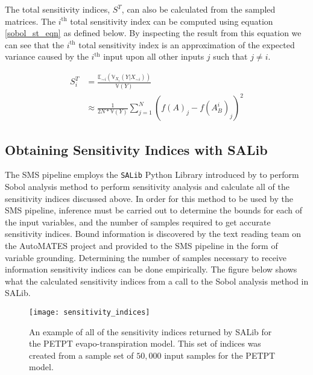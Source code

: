 The total sensitivity indices, $S^T$, can also be calculated from the sampled matrices. The $i^{\text{th}}$ total sensitivity index can be computed using equation \ref{sobol_st_eqn} as defined below. By inspecting the result from this equation we can see that the $i^{\text{th}}$ total sensitivity index is an approximation of the expected variance caused by the $i^{\text{th}}$ input upon all other inputs $j$ such that $j\neq i$.

\begin{equation} \label{sobol_st_eqn}
  \begin{split}
    S_i^T & = \frac{\mathbb{E}_{\sim i}\left(\mathbb{V}_{X_i}(Y | X_{\sim i})\right)}{\mathbb{V}(Y)} \\
    & \approx \frac{1}{2N * \mathbb{V}(Y)} \sum_{j=1}^{N} \left(f(A)_j - f(A_{B}^{i})_j\right)^2
  \end{split}
\end{equation}

\subsection{Obtaining Sensitivity Indices with SALib\label{sec:si_analysis}}
The SMS pipeline employs the \texttt{SALib} Python Library introduced by \citet{salib2017} to perform Sobol analysis method to perform sensitivity analysis and calculate all of the sensitivity indices discussed above.
In order for this method to be used by the SMS pipeline, inference must be carried out to determine the bounds for each of the input variables, and the number of samples required to get accurate sensitivity indices.
Bound information is discovered by the text reading team on the AutoMATES project and provided to the SMS pipeline in the form of variable grounding.
Determining the number of samples necessary to receive information sensitivity indices can be done empirically.
The figure below shows what the calculated sensitivity indices from a call to the Sobol analysis method in SALib.

\FloatBarrier
\begin{figure}[!htbp]
    \label{sens_idxs}
    \centering
    \texttt{[image: sensitivity\_indices]}%
    \caption[PETPT Sensitivity Indices]{An example of all of the sensitivity indices returned by SALib for the PETPT evapo-transpiration model. This set of indices was created from a sample set of $50,000$ input samples for the PETPT model.}
\end{figure}
\FloatBarrier

